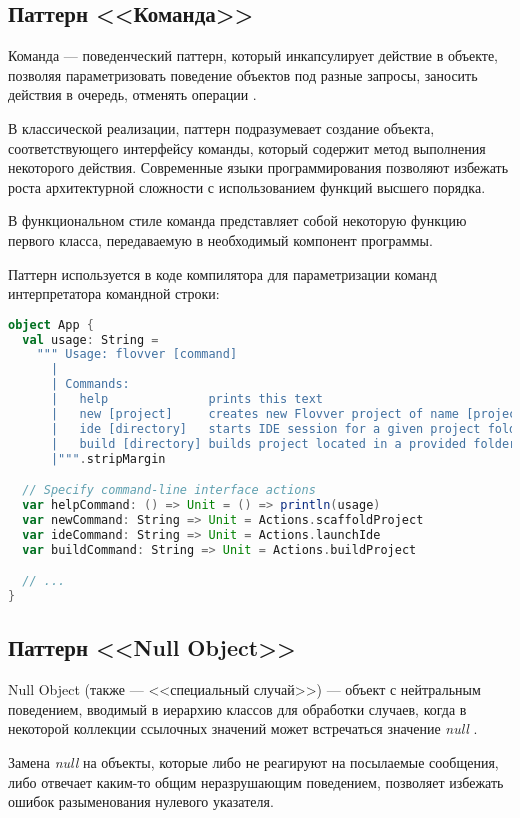 \subsection{Паттерн <<Команда>>}\label{sec:ch3/sect2/subsec1}

Команда --- поведенческий паттерн, который инкапсулирует действие в объекте,
позволяя параметризовать поведение объектов под разные запросы, заносить
действия в очередь, отменять операции \cite[с.~276]{gof}.

В классической реализации, паттерн подразумевает создание объекта,
соответствующего интерфейсу команды, который содержит метод выполнения
некоторого действия. Современные языки программирования позволяют избежать
роста архитектурной сложности с использованием функций высшего порядка.

В функциональном стиле команда представляет собой некоторую функцию
первого класса, передаваемую в необходимый компонент программы.

Паттерн используется в коде компилятора для параметризации команд
интерпретатора командной строки:

\begin{lstlisting}[language=Scala]
object App {
  val usage: String =
    """ Usage: flovver [command]
      |
      | Commands:
      |   help              prints this text
      |   new [project]     creates new Flovver project of name [project]
      |   ide [directory]   starts IDE session for a given project folder
      |   build [directory] builds project located in a provided folder
      |""".stripMargin

  // Specify command-line interface actions
  var helpCommand: () => Unit = () => println(usage)
  var newCommand: String => Unit = Actions.scaffoldProject
  var ideCommand: String => Unit = Actions.launchIde
  var buildCommand: String => Unit = Actions.buildProject

  // ...
}
\end{lstlisting}

\subsection{Паттерн <<Null Object>>}

Null Object (также --- <<специальный случай>>) --- объект с нейтральным поведением,
вводимый в иерархию классов для обработки случаев, когда в некоторой коллекции
ссылочных значений может встречаться значение \textit{null} \cite{specialcase}.

Замена \textit{null} на объекты, которые либо не реагируют на посылаемые
сообщения, либо отвечает каким-то общим неразрушающим поведением,
позволяет избежать ошибок разыменования нулевого указателя.

